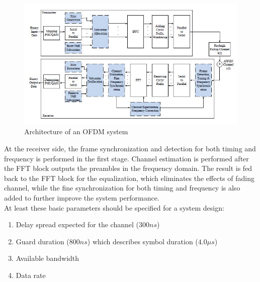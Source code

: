 \begin{figure}[h!]
\centering
\includegraphics[width=12cm]{content/fig/ieee_system_design.JPG}
\caption{Architecture of an OFDM system}
\label{fig:arch_ofdm_sys}
\end{figure}

At the receiver side, the frame synchronization and detection for both timing and frequency is performed in the first stage. Channel estimation is performed after the FFT block outputs the preambles in the frequency domain. The result is fed back to the FFT block for the equalization, which eliminates the effects of fading channel, while the fine synchronization for both timing and frequency is also added to further improve the system performance.\\
At least these basic parameters should be specified for a system design:

\begin{enumerate}
  \item Delay spread expected for the channel ($300 ns$)
  \item Guard duration ($800 ns$) which describes symbol duration ($4.0 \mu s$)
  \item Available bandwidth
  \item Data rate
\end{enumerate}

